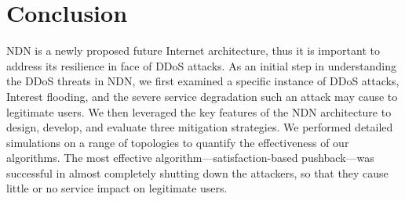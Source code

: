 \section{Conclusion}
\label{sec:conclusion}


%
%

NDN is a newly proposed future Internet architecture, thus it is important to address its resilience in face of DDoS attacks. As an initial step in understanding the DDoS threats in NDN, we first examined a specific instance of DDoS attacks, Interest flooding, and the severe service degradation such an attack may cause to legitimate users. We then leveraged the key features of the NDN architecture to design, develop, and evaluate three mitigation strategies.
We performed detailed simulations on a range of topologies to quantify the effectiveness of our algorithms.   
The most effective algorithm---satisfaction-based pushback---was successful in almost completely shutting down the attackers, so that they cause little or no service impact on legitimate users.


